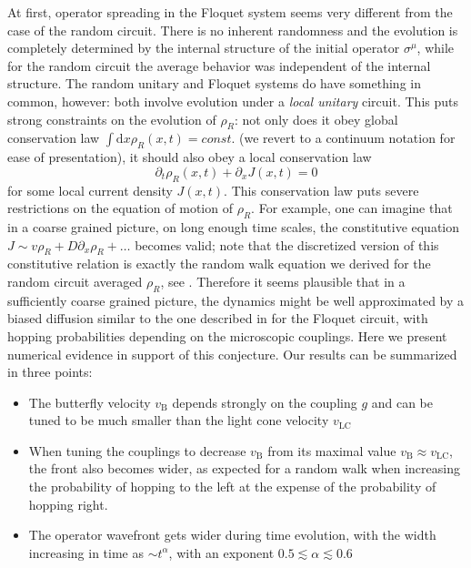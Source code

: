 \documentclass[aps,prb,twocolumn,superscriptaddress]{revtex4-1}
\begin{document}
At first, operator spreading in the Floquet system seems very different from the case of the random circuit. There is no inherent randomness and the evolution is completely determined by the internal structure of the initial operator $\sigma^\mu$, while for the random circuit the average behavior was independent of the internal structure. The random unitary and Floquet systems do have something in common, however: both involve evolution under a \textit{local unitary} circuit. This puts strong constraints on the evolution of $\rho_R$: not only does it obey global conservation law $\int \text{d}x \rho_{R}(x,t) = const.$ (we revert to a continuum notation for ease of presentation), it should also obey a local conservation law 
\begin{equation}
\partial_t \rho_{R}(x,t) +\partial_x J(x,t) = 0
\end{equation}
for some local current density $J(x,t)$. This conservation law puts severe restrictions on the equation of motion of $\rho_R$. For example, one can imagine that in a coarse grained picture, on long enough time scales, the constitutive equation $J\sim v \rho_R + D \partial_x \rho_R +\ldots$ becomes valid; note that the discretized version of this constitutive relation is exactly the random walk equation we derived for the random circuit averaged $\rho_R$, see .  Therefore it seems plausible that in a sufficiently coarse grained picture, the dynamics might be well approximated by a biased diffusion similar to the one described in  for the Floquet circuit, with hopping probabilities depending on the microscopic couplings. Here we present numerical evidence in support of this conjecture. Our results can be summarized in three points:
\begin{itemize}
\item The butterfly velocity $v_{\text{B}}$ depends strongly on the coupling $g$ and can be tuned to be much smaller than the light cone velocity $v_\text{LC}$
\item When tuning the couplings to decrease $v_{\text{B}}$ from its maximal value $v_{\text{B}}\approx v_\text{LC}$, the front also becomes wider, as expected for a random walk when increasing the probability of hopping to the left at the expense of the probability of hopping right.
\item The operator wavefront gets wider during time evolution, with the width increasing in time as $\sim t^\alpha$, with an exponent $0.5\lesssim\alpha\lesssim 0.6$
\end{itemize}
\end{document}
